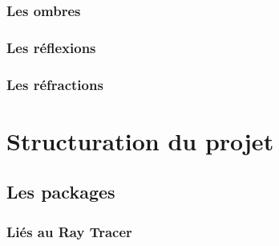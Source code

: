 \documentclass[11pt]{article}
\begin{document}
\subsubsection{Les ombres}
\subsubsection{Les réflexions}
\label{reflexions}
\subsubsection{Les réfractions}

\section{Structuration du projet}
\subsection{Les packages}
\subsubsection{Liés au Ray Tracer}
\end{document}
